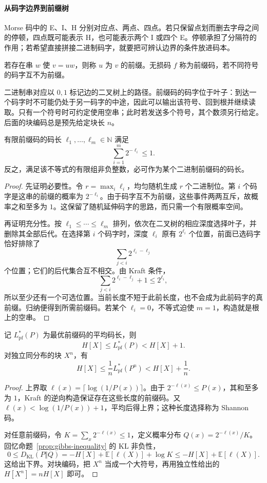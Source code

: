 \documentclass[lang=cn,a4paper,fontset=none,zihao=false,10pt,openany,twoside]{beautybook}
\numberwithin{algorithm}{chapter}
\newcommand{\N}{\mathbb N}
\newcommand{\KLsep}{\mathrel{\Vert}}
\begin{document}
\paragraph{从码字边界到前缀树}
Morse 码中的 E、I、H 分别对应点、两点、四点。若只保留点划而删去字母之间的停顿，四点既可能表示 H，也可能表示两个 I 或四个 E。停顿承担了分隔符的作用；若希望直接拼接二进制码字，就要把可辨认边界的条件放进码本。
\begin{definition}[前缀码]\label{def:prefix-code}
若存在串 $w$ 使 $v=uw$，则称 $u$ 为 $v$ 的前缀。无损码 $f$ 称为前缀码，若不同符号的码字互不为前缀。
\end{definition}
二进制串对应以 $0,1$ 标记边的二叉树上的路径。前缀码的码字位于叶子：到达一个码字时不可能仍处于另一码字的中途，因此可以输出该符号、回到根并继续读取。只有一个符号时可约定使用空串；此时若发送多个符号，其个数须另行给定。后面的块编码总是预先给定块长 $n$。

\begin{theorem}\label{thm:kraft}
有限前缀码的码长 $\ell_1,\ldots,\ell_m\in\N$ 满足
\[
 \sum_{i=1}^m2^{-\ell_i}\le1.
\]
反之，满足该不等式的有限组非负整数，必可作为某个二进制前缀码的码长。
\end{theorem}
\begin{proof}
先证明必要性。令 $r=\max_i\ell_i$，均匀随机生成 $r$ 个二进制位。第 $i$ 个码字是这串的前缀的概率为 $2^{-\ell_i}$。由于码字互不为前缀，这些事件两两互斥，故概率之和至多为 $1$。这保留了随机延伸码字的思路，而只需一个有限概率空间。

再证明充分性。按 $\ell_1\le\cdots\le\ell_m$ 排列，依次在二叉树的相应深度选择叶子，并删除其全部后代。在选择第 $i$ 个码字时，深度 $\ell_i$ 原有 $2^{\ell_i}$ 个位置，前面已选码字恰好排除了
\[
 \sum_{j<i}2^{\ell_i-\ell_j}
\]
个位置；它们的后代集合互不相交。由 Kraft 条件，
\[
 \sum_{j<i}2^{\ell_i-\ell_j}+1\le2^{\ell_i},
\]
所以至少还有一个可选位置。当前长度不短于此前长度，也不会成为此前码字的真前缀。归纳便得到所需前缀码。若某个 $\ell_i=0$，不等式迫使 $m=1$，构造就是根上的空串。
\end{proof}

\begin{theorem}[前缀码的熵界]\label{thm:prefix-entropy}
记 $L_{\mathrm{pf}}^*(P)$ 为最优前缀码的平均码长，则
\[
 H[X]\le L_{\mathrm{pf}}^*(P)<H[X]+1.
\]
对独立同分布的块 $X^n$，有
\[
 H[X]\le\frac1nL_{\mathrm{pf}}^*(P^n)<H[X]+\frac1n.
\]
\end{theorem}
\begin{proof}
上界取 $\ell(x)=\lceil\log(1/P(x))\rceil$。由于 $2^{-\ell(x)}\le P(x)$，其和至多为 $1$，Kraft 的逆向构造保证存在这些长度的前缀码。又 $\ell(x)<\log(1/P(x))+1$，平均后得上界；这种长度选择称为 Shannon 码。

对任意前缀码，令 $K=\sum_x2^{-\ell(x)}\le1$，定义概率分布 $Q(x)=2^{-\ell(x)}/K$。回忆命题~\ref{prop:gibbs-inequality} 的 KL 非负性，
\[
 0\le D_{\mathrm{KL}}(P\KLsep Q)
 =-H[X]+\mathbb E[\ell(X)]+\log K
 \le-H[X]+\mathbb E[\ell(X)].
\]
这给出下界。对块编码，把 $X^n$ 当成一个大符号，再用独立性给出的 $H[X^n]=nH[X]$ 即可。
\end{proof}
\end{document}
